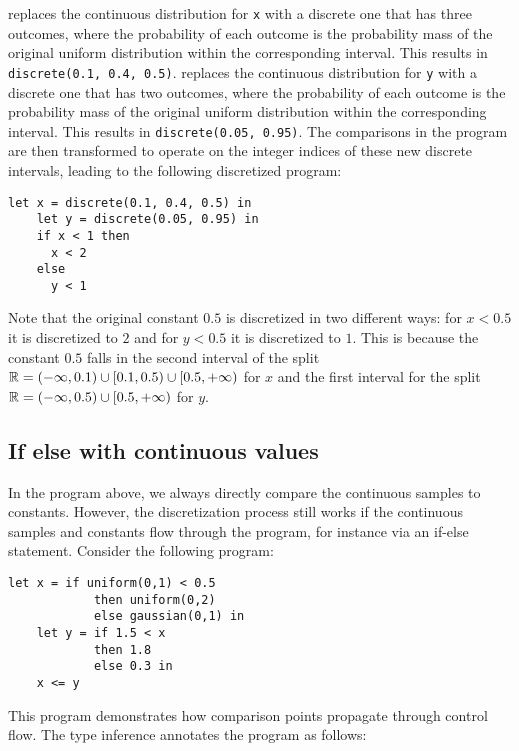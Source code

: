 \documentclass[acmsmall,screen,dvipsnames,x11names,nonacm,anonymous,review]{acmart}
\begin{document}
\Slice{} replaces the continuous distribution for \texttt{x} with a discrete one that has three outcomes, where the probability of each outcome is the probability mass of the original uniform distribution within the corresponding interval. This results in \texttt{discrete(0.1, 0.4, 0.5)}.
\Slice{} replaces the continuous distribution for \texttt{y} with a discrete one that has two outcomes, where the probability of each outcome is the probability mass of the original uniform distribution within the corresponding interval. This results in \texttt{discrete(0.05, 0.95)}. The comparisons in the program are then transformed to operate on the integer indices of these new discrete intervals, leading to the following discretized program:

\begin{lstlisting}[aboveskip=1em,belowskip=1em]
    let x = discrete(0.1, 0.4, 0.5) in
    let y = discrete(0.05, 0.95) in
    if x < 1 then
      x < 2
    else
      y < 1
\end{lstlisting}

Note that the original constant $0.5$ is discretized in two different ways: for $x < 0.5$ it is discretized to $2$ and for $y < 0.5$ it is discretized to $1$. This is because the constant $0.5$ falls in the second interval of the split $\mathbb{R} = (-\infty, 0.1) \cup [0.1, 0.5) \cup [0.5, +\infty)$ for $x$ and the first interval for the split $\mathbb{R} = (-\infty, 0.5) \cup [0.5, +\infty)$ for $y$.

\subsection{If else with continuous values}

In the program above, we always directly compare the continuous samples to constants.
However, the discretization process still works if the continuous samples and constants flow through the program, for instance via an if-else statement.
Consider the following program:

\begin{lstlisting}[aboveskip=1em,belowskip=1em,escapechar=!]
    let x = if uniform(0,1) < 0.5 
            then uniform(0,2) 
            else gaussian(0,1) in
    let y = if 1.5 < x
            then 1.8
            else 0.3 in
    x <= y
\end{lstlisting}

\noindent This program demonstrates how comparison points propagate through control flow. The type inference annotates the program as follows:
\end{document}
